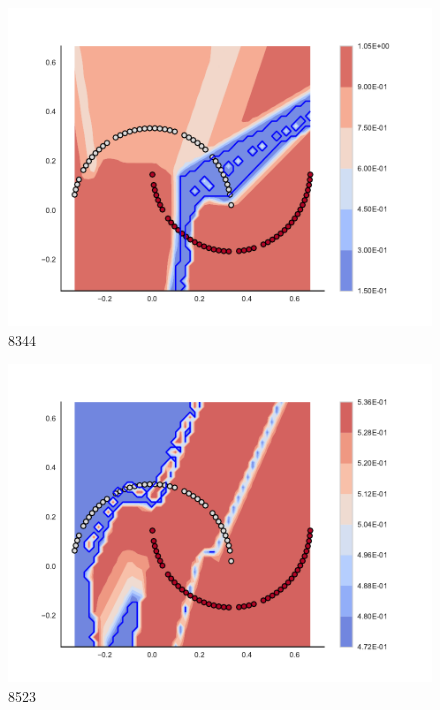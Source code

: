 \begin{subfigure}[b]{0.09\textwidth}
    \includegraphics[width=\textwidth]{img/convergence/8344.pdf}
    \caption{8344}
    \label{fig:convergence_8344}
\end{subfigure}
%
\begin{subfigure}[b]{0.09\textwidth}
    \includegraphics[width=\textwidth]{img/convergence/8523.pdf}
    \caption{8523}
    \label{fig:convergence_8523}
\end{subfigure}
%
